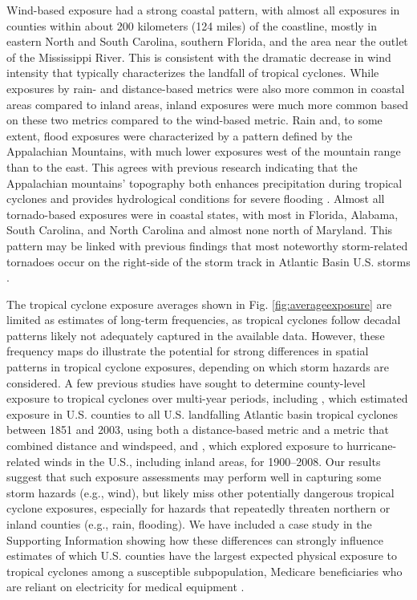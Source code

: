 \documentclass[fleqn,10pt,lineno]{olplainarticle}
\begin{document}
Wind-based exposure had a strong coastal pattern, with almost all exposures in
counties within about 200 kilometers (124 miles) of the coastline, mostly in
eastern North and South Carolina, southern Florida, and the area near the
outlet of the Mississippi River. This is consistent with the dramatic decrease
in wind intensity that typically characterizes the landfall of tropical
cyclones. While exposures by rain- and distance-based metrics were also more
common in coastal areas compared to inland areas, inland exposures were much
more common based on these two metrics compared to the wind-based metric. Rain
and, to some extent, flood exposures were characterized by a pattern defined by
the Appalachian Mountains, with much lower exposures west of the mountain range
than to the east. This agrees with previous research indicating that the
Appalachian mountains' topography both enhances precipitation during tropical
cyclones and provides hydrological conditions for severe flooding
\citep{rees2001}.  Almost all tornado-based exposures were in coastal states,
with most in Florida, Alabama, South Carolina, and North Carolina and almost
none north of Maryland. This pattern may be linked with previous findings that
most noteworthy storm-related tornadoes occur on the right-side of the storm
track in Atlantic Basin U.S. storms \citep{moore2012}.

The tropical cyclone exposure averages shown in Fig. \ref{fig:averageexposure}
are limited as estimates of long-term frequencies, as tropical cyclones follow
decadal patterns \citep{kossin2007more} likely not adequately captured in the
available data. However, these frequency maps do illustrate the potential for
strong differences in spatial patterns in tropical cyclone exposures, depending
on which storm hazards are considered. A few previous studies have sought to
determine county-level exposure to tropical cyclones over multi-year periods,
including \citep{zandbergen2009}, which estimated exposure in U.S. counties to
all U.S. landfalling Atlantic basin tropical cyclones between 1851 and 2003,
using both a distance-based metric and a metric that combined distance and
windspeed, and \citep{kruk2010}, which explored exposure to hurricane-related
winds in the U.S., including inland areas, for 1900--2008. Our results suggest
that such exposure assessments may perform well in capturing some storm hazards
(e.g., wind), but likely miss other potentially dangerous tropical cyclone
exposures, especially for hazards that repeatedly threaten northern or inland
counties (e.g., rain, flooding). We have included a case study in the Supporting
Information showing how these differences can strongly influence estimates of
which U.S. counties have the largest expected physical exposure to tropical
cyclones among a susceptible subpopulation, Medicare beneficiaries who are
reliant on electricity for medical equipment \citep{empower}.
\end{document}
